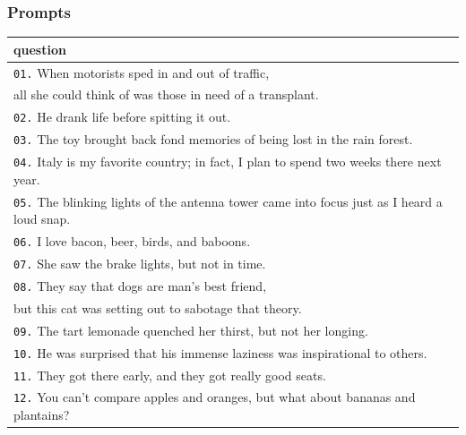 \documentclass[11pt, twoside, reqno]{book}
\begin{document}
\subsubsection{\textbf{Prompts}}
\begin{tabular}{|l|}
  \hline
    question \\ \hline
    \texttt{01.}\hspace{8pt} When motorists sped in and out of traffic,\\\hspace{24pt} all she could think of was those in need of a transplant. \\ \hline
    \texttt{02.}\hspace{8pt} He drank life before spitting it out. \\ \hline
    \texttt{03.}\hspace{8pt} The toy brought back fond memories of being lost in the rain forest. \\ \hline
    \texttt{04.}\hspace{8pt} Italy is my favorite country; in fact, I plan to spend two weeks there next year. \\ \hline
    \texttt{05.}\hspace{8pt} The blinking lights of the antenna tower came into focus just as I heard a loud snap. \\ \hline
    \texttt{06.}\hspace{8pt} I love bacon, beer, birds, and baboons. \\ \hline
    \texttt{07.}\hspace{8pt} She saw the brake lights, but not in time. \\ \hline
    \texttt{08.}\hspace{8pt} They say that dogs are man's best friend, \\\hspace{24pt} but this cat was setting out to sabotage that theory. \\ \hline
    \texttt{09.}\hspace{8pt} The tart lemonade quenched her thirst, but not her longing. \\ \hline
    \texttt{10.}\hspace{8pt} He was surprised that his immense laziness was inspirational to others. \\ \hline
    \texttt{11.}\hspace{8pt} They got there early, and they got really good seats. \\ \hline
    \texttt{12.}\hspace{8pt} You can't compare apples and oranges, but what about bananas and plantains? \\ \hline
  \end{tabular}
\vspace{16pt}
\end{document}
